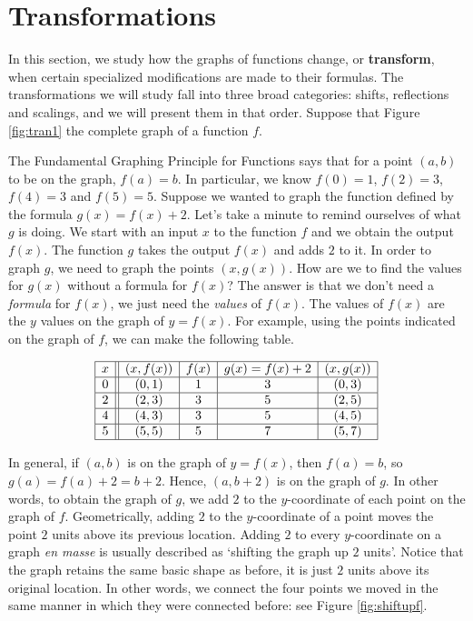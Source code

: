 
\section{Transformations}
\label{Transformations}

In this section, we study how the graphs of functions change, or \textbf{transform}, when certain specialized modifications are made to their formulas. The transformations we will study fall into three broad categories:  shifts, reflections and scalings, and we will present them in that order.  Suppose that Figure \ref{fig:tran1} the complete graph of a function $f$.



The Fundamental Graphing Principle for Functions says that for a point $(a,b)$ to be on the graph, $f(a) = b$.  In particular, we know $f(0) = 1$, $f(2)=3$, $f(4)=3$ and $f(5)=5$.  Suppose we wanted to graph the function defined by the formula $g(x) = f(x) + 2$.  Let's take a minute to remind ourselves of what $g$ is doing.  We start with an input $x$ to the function $f$ and we obtain the output $f(x)$.  The function $g$ takes the output $f(x)$ and adds $2$ to it.  In order to graph $g$, we need to graph the points $(x,g(x))$.  How are we to find the values for $g(x)$ without a formula for $f(x)$?  The answer is that we don't need a \textit{formula} for $f(x)$, we just need the \textit{values} of $f(x)$.  The values of $f(x)$ are the $y$ values on the graph of $y=f(x)$.  For example, using the points indicated on the graph of $f$, we can make the following table.

\[ \begin{array}{|c||c|c|c|c|}  

\hline

 x & (x,f(x)) & f(x) & g(x)=f(x)+2 & (x, g(x)) \\ \hline
0  & (0,1)& 1 & 3 &(0, 3) \\  \hline
2 & (2,3) & 3 &  5 &(2,5) \\  \hline
4 & (4,3) & 3 &  5 &(4, 5) \\  \hline
5 & (5,5) & 5 &  7 &( 5 ,7) \\  \hline

\end{array} \] 

In general, if $(a,b)$ is on the graph of $y=f(x)$, then $f(a) = b$, so $g(a) = f(a) +2 = b+2$.  Hence, $(a,b+2)$ is on the graph of $g$. In other words, to obtain the graph of $g$, we add $2$ to the $y$-coordinate of each point on the graph of $f$.  Geometrically, adding $2$ to the $y$-coordinate of a point moves the point $2$ units above its previous location.  Adding $2$ to every $y$-coordinate on a graph \textit{en masse} is usually described as `shifting the graph up $2$ units'.  Notice that the graph retains the same basic shape as before, it is just $2$ units above its original location.  In other words, we connect the four points we moved in the same manner in which they were connected before: see Figure \ref{fig:shiftupf}.

